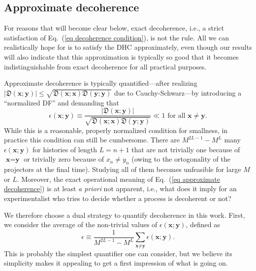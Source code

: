 \documentclass[pre,twocolumn,10pt,aps,longbibliography,nofootinbib]{revtex4-1}
\newcommand{\bb}[1]{\textbf{#1}}
\newcommand{\mf}[1]{{\mathfrak{#1}}}
\newcommand{\new}[1]{#1}
\begin{document}
\subsection{\new{Approximate decoherence}}
\label{sec approximate decoherence}

For reasons that will become clear below, exact decoherence, i.e., a strict satisfaction of Eq.~(\ref{eq decoherence condition}), is not the rule. All we can realistically hope for is to satisfy the DHC approximately, even though our results will also indicate that this approximation is typically so good that it becomes indistinguishable from exact decoherence for all practical purposes.

Approximate decoherence is typically quantified---after realizing $|\mf{D}(\bb x;\bb y)|\le\sqrt{\mf{D}(\bb x;\bb x)\mf{D}(\bb y;\bb y)}$ due to Cauchy-Schwarz---by introducing a ``normalized DF'' and demanding that~\cite{DowkerHalliwellPRD1992}
\begin{equation}\label{eq approximate decoherence}
 \epsilon(\bb x;\bb y) \equiv \frac{|\mf{D}(\bb x;\bb y)|}{\sqrt{\mf{D}(\bb x;\bb x)\mf{D}(\bb y;\bb y)}} \ll 1 \text{ for all } \bb x\neq\bb y.
\end{equation}
While this is a reasonable, properly normalized condition for smallness, in practice this condition can still be cumbersome. There are $M^{2L-1}-M^L$ many $\epsilon(\bb x;\bb y)$ for histories of length $L=n+1$ that are not trivially one because of $\bb x=\bb y$ or trivially zero because of $x_n\neq y_n$ (owing to the ortogonality of the projectors at the final time). Studying all of them becomes unfeasible for large $M$ or $L$. Moreover, the exact operational meaning of Eq.~(\ref{eq approximate decoherence}) is at least \emph{a priori} not apparent, i.e., what does it imply for an experimentalist who tries to decide whether a process is decoherent or not?

We therefore choose a dual strategy to quantify decoherence in this work. First, we consider the average of the non-trivial values of $\epsilon(\bb x;\bb y)$, defined as
\begin{equation}\label{eq epsilon avg}
 \epsilon \equiv \frac{1}{M^{2L-1}-M^L} \sum_{\bb x\neq\bb y} \epsilon(\bb x;\bb y).
\end{equation}
This is probably the simplest quantifier one can consider, but we believe its simplicity makes it appealing to get a first impression of what is going on.
\end{document}
